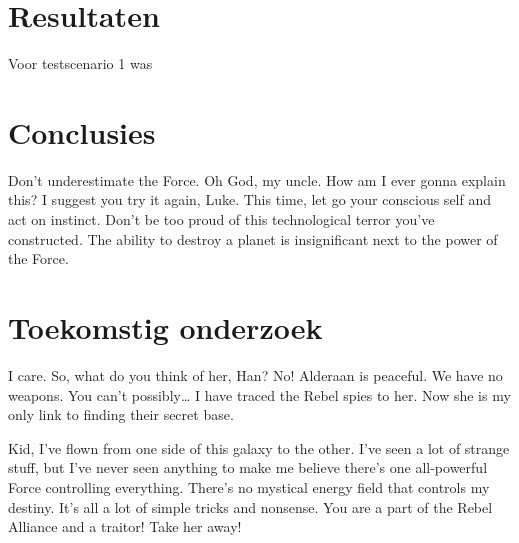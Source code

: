 \documentclass[a0,portrait]{hogent-poster}
\begin{document}
\begin{multicols}{2}
\section{Resultaten}

Voor testscenario 1 was



\section{Conclusies}
Don't underestimate the Force. Oh God, my uncle. How am I ever gonna explain this? I suggest you try it again, Luke. This time, let go your conscious self and act on instinct. Don't be too proud of this technological terror you've constructed. The ability to destroy a planet is insignificant next to the power of the Force.

\section{Toekomstig onderzoek}

I care. So, what do you think of her, Han? No! Alderaan is peaceful. We have no weapons. You can't possibly… I have traced the Rebel spies to her. Now she is my only link to finding their secret base.

Kid, I've flown from one side of this galaxy to the other. I've seen a lot of strange stuff, but I've never seen anything to make me believe there's one all-powerful Force controlling everything. There's no mystical energy field that controls my destiny. It's all a lot of simple tricks and nonsense. You are a part of the Rebel Alliance and a traitor! Take her away! 

\end{multicols}
\end{document}
